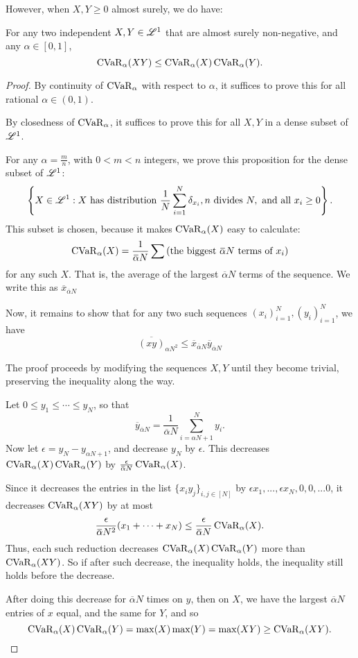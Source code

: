 However, when $X, Y\ge 0$ almost surely, we do have:
\begin{prop}
	For any two independent $X, Y\in \mathscr{L}^1$ that are almost surely non-negative, and any $\alpha \in [0, 1]$, 
	\begin{equation}
		\operatorname{CVaR}_\alpha(XY) \le \operatorname{CVaR}_\alpha(X)\operatorname{CVaR}_\alpha(Y).
	\end{equation}
\end{prop}
\begin{proof}	
	By continuity of $\operatorname{CVaR}_\alpha$ with respect to $\alpha$, it suffices to prove this for all rational $\alpha \in(0, 1)$. 
	
	By closedness of $\operatorname{CVaR}_\alpha$, it suffices to prove this for all $X, Y$ in a dense subset of $\mathscr{L}^1$.
	
	For any $\alpha = \frac m n$, with $0< m < n$ integers, we prove this proposition for the dense subset of $\mathscr{L}^1$:
	$$ \left\{X\in \mathscr{L}^1 : X \text{ has distribution } \frac 1{N} \sum_{i= 1}^{N} \delta_{x_i}, n\text{ divides }N, \text{ and all } x_i \ge 0 \right\}.$$
	This subset is chosen, because it makes $\operatorname{CVaR}_\alpha(X)$ easy to calculate: 
	$$\cvar_\alpha(X) = \frac 1{{\overbar{\alpha}} N}\sum\left(\text{the biggest } {\overbar{\alpha}} N \text{ terms of }x_i\right)$$
	for any such $X$. That is, the average of the largest ${\overbar{\alpha}} N$ terms of the sequence. We write this as $\overbar x_{{\overbar{\alpha}} N}$
	
	Now, it remains to show that for any two such sequences $(x_i)_{i=1}^N,  (y_i)_{i=1}^N$, we have 
	$$\overbar{(xy)}_{\alpha N^2} \le \overbar x_{{\overbar{\alpha}} N} \overbar y_{{\overbar{\alpha}} N}$$ 
	
	The proof proceeds by modifying the sequences $X, Y$ until they become trivial, preserving the inequality along the way.
	
	Let $0\le y_1 \le \cdots \le y_N$, so that 
	$$\overbar y_{{\overbar{\alpha}} N} = \frac 1{{\overbar{\alpha}} N}\sum_{i=\alpha N + 1}^{N}y_i.$$
	Now let $\epsilon = y_N - y_{\alpha N + 1}$, and decrease $y_N$ by $\epsilon$. This decreases $\operatorname{CVaR}_\alpha(X)\operatorname{CVaR}_\alpha(Y)$ by $\frac{\epsilon}{{\overbar{\alpha}} N} \cvar_\alpha(X)$.
	
	Since it decreases the entries in the list $\{x_iy_j\}_{i, j \in[N]}$ by $\epsilon x_1, ..., \epsilon x_N, 0, 0, ... 0$, it decreases $ \operatorname{CVaR}_\alpha(XY)$ by at most 
	$$\frac{\epsilon}{{\overbar{\alpha}} N^2} (x_1 + \cdots + x_N) \le \frac{\epsilon}{{\overbar{\alpha}} N} \cvar_\alpha(X).$$
	Thus, each such reduction decreases $\operatorname{CVaR}_\alpha(X)\operatorname{CVaR}_\alpha(Y)$ more than $\operatorname{CVaR}_\alpha(XY)$. So if after such decrease, the inequality holds, the inequality still holds before the decrease.
	
	After doing this decrease for ${\overbar{\alpha}} N$ times on $y$, then on $X$, we have the largest ${\overbar{\alpha}} N$ entries of $x$ equal, and the same for $Y$, and so 
	$$\operatorname{CVaR}_\alpha(X)\operatorname{CVaR}_\alpha(Y) = \max(X)\max(Y) = \max(XY) \ge \operatorname{CVaR}_\alpha(XY).$$
 \end{proof}

